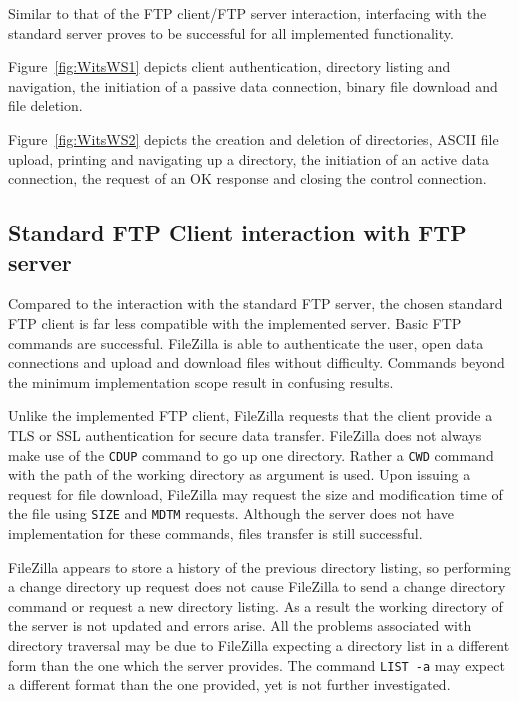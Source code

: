 \documentclass[10pt,twocolumn]{witseiepaper}
\begin{document}
Similar to that of the FTP client/FTP server interaction, interfacing with the standard server proves to be successful for all implemented functionality. 

Figure~\ref{fig:WitsWS1} depicts client authentication, directory listing and navigation, the initiation of a passive data connection, binary file download and file deletion. 

Figure~\ref{fig:WitsWS2} depicts the creation and deletion of directories, ASCII file upload, printing and navigating up a directory, the initiation of an active data connection, the request of an OK response and closing the control connection.

\subsection{Standard FTP Client interaction with FTP server}

Compared to the interaction with the standard FTP server, the chosen standard FTP client is far less compatible with the implemented server. Basic FTP commands are successful. FileZilla is able to authenticate the user, open data connections and upload and download files without difficulty. Commands beyond the minimum implementation scope result in confusing results.

Unlike the implemented FTP client, FileZilla requests that the client provide a TLS or SSL authentication for secure data transfer. FileZilla does not always make use of the \texttt{CDUP} command to go up one directory. Rather a \texttt{CWD} command with the path of the working directory as argument is used. Upon issuing a request for file download, FileZilla may request the size and modification time of the file using \texttt{SIZE} and \texttt{MDTM} requests. Although the server does not have implementation for these commands, files transfer is still successful.

FileZilla appears to store a history of the previous directory listing, so performing a change directory up request does not cause FileZilla to send a change directory command or request a new directory listing. As a result the working directory of the server is not updated and errors arise. All the problems associated with directory traversal may be due to FileZilla expecting a directory list in a different form than the one which the server provides. The command \texttt{LIST~-a} may expect a different format than the one provided, yet is not further investigated.
\end{document}
